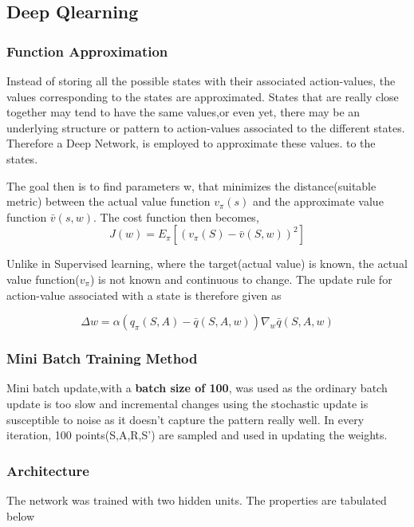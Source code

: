 \documentclass[12pt]{article}
\begin{document}
\subsection{Deep Qlearning}
\subsubsection{Function Approximation}
Instead of storing all the possible states with their associated action-values, the values corresponding to the states are approximated. 
States that are really close together may tend to have the same values,or even yet, there may be an underlying structure or pattern to 
action-values associated to the different states. Therefore a Deep Network, is employed to approximate these values. 
to the states.

The goal then is to find parameters w, that minimizes the distance(suitable metric) between the actual value function $v_\pi(s)$ and 
the approximate value function $\bar{v}(s,w)$.
The cost function then becomes,
\begin{equation}
    J(w) =  E_\pi[(v_\pi(S) - \bar{v}(S,w))^2]
\end{equation}

Unlike in Supervised learning, 
where the target(actual value)  is known, the actual value function($v_\pi$) is not known and continuous to 
change.  The update rule for action-value associated with a state is therefore given as

\begin{equation}
  \Delta w = \alpha(q_\pi(S,A)-\bar{q}(S,A,w))\nabla_{w}\bar{q}(S,A,w)
\end{equation}

\subsubsection{Mini Batch Training Method}
Mini batch update,with a \textbf{batch size of 100},  was used as the ordinary batch update is too slow and incremental changes using
the stochastic update is susceptible to noise as it doesn't capture the pattern really well. In every iteration, 100 points(S,A,R,S') are 
sampled and used in updating the weights.


\subsubsection{Architecture} 
The network was trained with two hidden units. The properties are tabulated below
\end{document}
